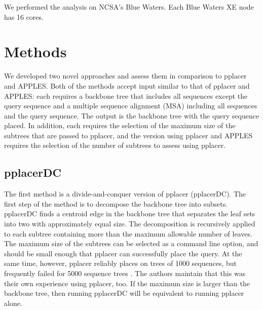 \documentclass[10pt]{article}
\begin{document}
We performed the analysis on NCSA's Blue Waters. Each Blue Waters XE node has 16 cores.


\section{Methods}

We developed two novel approaches and assess them in comparison to pplacer and APPLES.
Both of the methods accept input similar to that of pplacer and APPLES:
each requires a backbone tree that includes all sequences except the query sequence and a multiple sequence alignment (MSA) including all sequences and the query sequence.
The output is the backbone tree with the query sequence placed.
In addition, each requires the selection of the maximum size of the subtrees that are passed to pplacer, and the version using pplacer and APPLES requires the selection of the number of subtrees to assess using pplacer.

\subsection{pplacerDC}

The first method is a divide-and-conquer version of pplacer (pplacerDC).
The first step of the method is to decompose the backbone tree into subsets.
pplacerDC finds a centroid edge in the backbone tree that separates the leaf
sets into two with approximately equal size.
The decomposition is recursively applied to each subtree containing more
than the maximum allowable number of leaves.
The maximum size of the subtrees can be selected as a command line option, and should be small enough that pplacer can successfully place the query.
At the same time, however, 
pplacer reliably places on trees of 1000 sequences, but frequently failed for 5000 sequence trees \cite{balaban_apples_2020}.
The authors maintain that this was their own experience using pplacer, too.
If the maximum size is larger than the backbone tree, then running pplacerDC will be equivalent to running pplacer alone.
\end{document}
